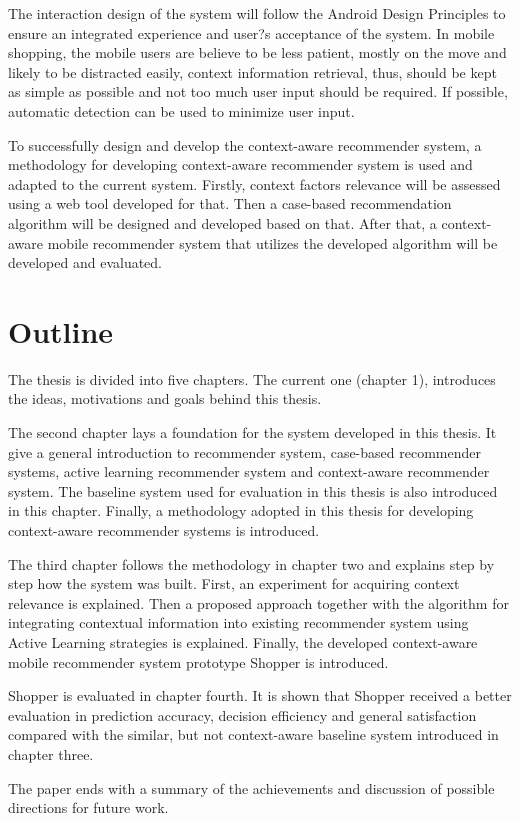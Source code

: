 The interaction design of the system will follow the Android Design Principles to ensure an integrated experience and user?s acceptance of the system. In mobile shopping, the mobile users are believe to be less patient, mostly on the move and likely to be distracted easily, context information retrieval, thus, should be kept as simple as possible and not too much user input should be required. If possible, automatic detection can be used to minimize user input.

To successfully design and develop the context-aware recommender system, a methodology for developing context-aware recommender system is used and adapted to the current system. Firstly, context factors relevance will be assessed using a web tool developed for that. Then a case-based recommendation algorithm will be designed and developed based on that. After that, a context-aware mobile recommender system that utilizes the developed algorithm will be developed and evaluated.

\section{Outline} \label{sec:ol}

The thesis is divided into five chapters. The current one (chapter 1), introduces the ideas, motivations and goals behind this thesis.

The second chapter lays a foundation for the system developed in this thesis. It give a general introduction to recommender system, case-based recommender systems, active learning recommender system and context-aware recommender system. The baseline system used for evaluation in this thesis is also introduced in this chapter. Finally, a methodology adopted in this thesis for developing context-aware recommender systems is introduced.

The third chapter follows the methodology in chapter two and explains step by step how the system was built. First, an experiment for acquiring context relevance is explained. Then a proposed approach together with the algorithm for integrating contextual information into existing recommender system using Active Learning strategies is explained. Finally, the developed context-aware mobile recommender system prototype Shopper is introduced. 

Shopper is evaluated in chapter fourth. It is shown that Shopper received a better evaluation in prediction accuracy, decision efficiency and general satisfaction compared with the similar, but not context-aware baseline system introduced in chapter three.

The paper ends with a summary of the achievements and discussion of possible directions for future work.

